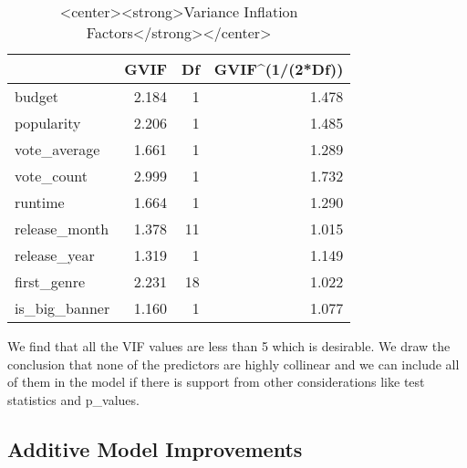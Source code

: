 \documentclass[
]{article}
\newenvironment{Shaded}{\begin{snugshade}}{\end{snugshade}}
\newcommand{\DataTypeTok}[1]{\textcolor[rgb]{0.13,0.29,0.53}{#1}}
\newcommand{\KeywordTok}[1]{\textcolor[rgb]{0.13,0.29,0.53}{\textbf{#1}}}
\newcommand{\NormalTok}[1]{#1}
\newcommand{\OperatorTok}[1]{\textcolor[rgb]{0.81,0.36,0.00}{\textbf{#1}}}
\newcommand{\StringTok}[1]{\textcolor[rgb]{0.31,0.60,0.02}{#1}}
\begin{document}
\begin{Shaded}
\end{Shaded}

\begin{table}

\caption{\label{tab:unnamed-chunk-20}<center><strong>Variance Inflation Factors</strong></center>}
\centering
\begin{tabular}[t]{l|r|r|r}
\hline
  & GVIF & Df & GVIF\textasciicircum{}(1/(2*Df))\\
\hline
budget & 2.184 & 1 & 1.478\\
\hline
popularity & 2.206 & 1 & 1.485\\
\hline
vote\_average & 1.661 & 1 & 1.289\\
\hline
vote\_count & 2.999 & 1 & 1.732\\
\hline
runtime & 1.664 & 1 & 1.290\\
\hline
release\_month & 1.378 & 11 & 1.015\\
\hline
release\_year & 1.319 & 1 & 1.149\\
\hline
first\_genre & 2.231 & 18 & 1.022\\
\hline
is\_big\_banner & 1.160 & 1 & 1.077\\
\hline
\end{tabular}
\end{table}

We find that all the VIF values are less than 5 which is desirable. We
draw the conclusion that none of the predictors are highly collinear and
we can include all of them in the model if there is support from other
considerations like test statistics and p\_values.

\hypertarget{additive-model-improvements}{%
\subsection{Additive Model
Improvements}\label{additive-model-improvements}}
\end{document}
